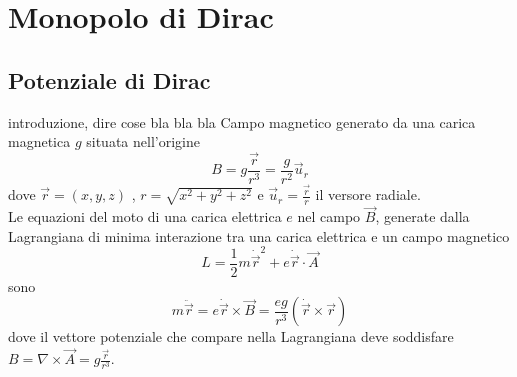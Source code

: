 \chapter{Monopolo di Dirac}
\section{Potenziale di Dirac}
%
introduzione, dire cose bla bla bla
Campo magnetico generato da una carica magnetica $g$ situata nell'origine
$$
   B = g \frac{\vec r}{r^3} = \frac{g}{r^2} \vec u _r
$$
dove $\vec r = (x,y,z)$ , $r = \sqrt{x^2 + y^2 + z^2}$ e $\vec u _r = \frac{\vec r}{r}$
il versore radiale.\\
Le equazioni del moto di una carica elettrica $e$ nel campo $\vec B$,
generate dalla Lagrangiana di minima interazione tra una carica elettrica e un campo
magnetico
$$
   L = \frac{1}{2} m \dot{\vec r} ^2 + e \dot{\vec r} \cdot \vec A
$$
sono
$$
   m \ddot{\vec r} = e\dot{\vec r} \times \vec B =
      \frac{eg}{r^3}(\dot{\vec r} \times \vec r)
$$
dove il vettore potenziale che compare nella Lagrangiana deve soddisfare
$B = \nabla \times \vec A = g \frac{\vec r}{r^3}$.\\

